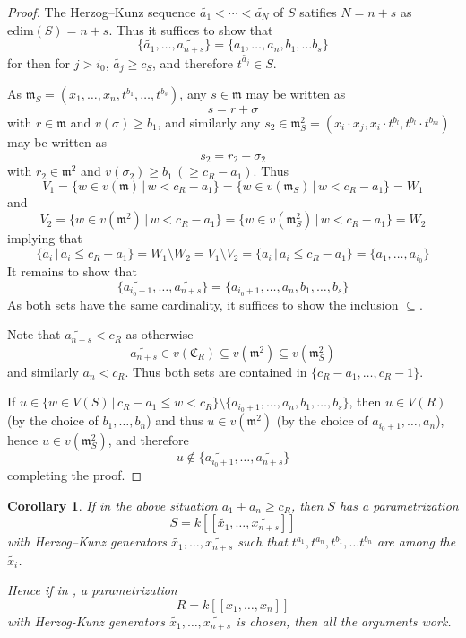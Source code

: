 \documentclass[12pt]{amsart}
\theoremstyle{plain}%
\newtheorem{Corollary}[satz]{Corollary}
\theoremstyle{definition}
\renewcommand{\(}{\left(}
\renewcommand{\)}{\right)}
\renewcommand{\leq}{\leqslant}
\renewcommand{\geq}{\geqslant}
\begin{document}
\begin{proof}
The Herzog--Kunz sequence $\widetilde{a_1} < \cdots < 
\widetilde{a_N}$ of $S$ satifies $N = n+s$ as 
$\mathrm{edim}(S) = n+s$. Thus it suffices to show that 
	$$ \{ \widetilde{a_1} ,\ldots ,\widetilde{a_{n+s}}\} = 
	\{a_1, \ldots, a_n, b_1, \ldots b_s\} $$
for then for $j > i_0$, $\widetilde{a_j} \geq c_S$, and 
therefore $t^{\widetilde{a_j}} \in S$.

As $\mathfrak m_S = (x_1, \ldots, x_n, t^{b_1}, \ldots, 
t^{b_s})$, any $s \in \mathfrak m$ may be written as 
	$$ s = r + \sigma $$
with $r \in \mathfrak m$ and $v(\sigma) \geq b_1 $, and 
similarly any $s_2 \in \mathfrak m_S^2 = (x_i \cdot x_j, 
x_i \cdot t^{b_l}, t^{b_l} \cdot t^{b_m})$ 
may be written as 
	$$ s_2 = r_2 + \sigma_2 $$
with $r_2 \in \mathfrak m^2$ and $v(\sigma_2) \geq b_1 \,
(\geq c_R -a_1)$. Thus 
	$$ V_1 = \{w\in v(\mathfrak m)\,\vert\,w < c_R -a_1\} = 
	\{w\in v(\mathfrak m_S)\,\vert \, w < c_R -a_1\} = W_1 $$
and 
	$$ V_2=\{ w\in v(\mathfrak m^2)\,\vert \,w<c_R-a_1\} = 
	\{w \in v(\mathfrak m^2_S)\,\vert \,w < c_R -a_1\}=W_2 $$
implying that 
	$$ \{ \widetilde{a_i} \, \vert \, \widetilde{a_i} 
    \leq c_R-a_1 \} = W_1 \setminus W_2
	= V_1 \setminus V_2 =\{a_i\, \vert \,a_i\leq c_R-a_1 \} 
    = \{a_1, \ldots, a_{i_0} \} $$
It remains to show that 
	$$\{\widetilde{a_{i_0+1}},\ldots,\widetilde{a_{n+s}}\}= 
	\{ a_{i_0+1}, \ldots, a_n, b_1, \ldots, b_s \} $$
As both sets have the same cardinality, it suffices to show 
the inclusion $\subseteq$. 

Note that $\widetilde{a_{n+s}} < c_R$ as otherwise 
	$$ \widetilde{a_{n+s}} \in v(\mathfrak C_R) \subseteq 
    v(\mathfrak m^2) \subseteq v(\mathfrak m_S^2) $$
and similarly $a_n < c_R$. Thus both sets are contained in 
$\{c_R-a_1, \ldots, c_R-1\}$. 

If $u \in \{w \in V(S) \, \vert \, c_R-a_1 \leq w < c_R \} 
\setminus \{ a_{i_0+1}, \ldots, a_n, b_1, \ldots, b_s\}$, 
then $u \in V(R)$ (by the choice of $b_1, \ldots, b_n$) 
and thus 
$u \in v(\mathfrak m^2)$ (by the choice of $a_{i_0+1}, 
\ldots, a_n$), hence $u \in v(\mathfrak m_S^2)$, 
and therefore 
	$$ u \notin \{ \widetilde{a_{i_0+1}}, \ldots, 
    \widetilde{a_{n+s}} \} $$
completing the proof. 
 
\end{proof}

\begin{Corollary}
If in the above situation $a_1 + a_n \geq c_R$, then $S$ 
has a parametrization 
	$$ S=k[[\widetilde{x_1},\ldots,\widetilde{x_{n+s}}]] $$
with Herzog--Kunz generators $\widetilde{x_1}, \ldots, 
\widetilde{x_{n+s}}$ such that $t^{a_1}, 
t^{a_n}, t^{b_1}, \ldots t^{b_n}$ are among the  
$\widetilde{x_i}$. 

Hence if in \cite[Theorem 4.4]{MM}, a parametrization  
	$$ R = k[[x_1, \ldots, x_n]] $$
with Herzog-Kunz generators $\widetilde{x_1}, \ldots, 
\widetilde{x_{n+s}}$ is chosen, then all the arguments work.
\end{Corollary}
\end{document}
